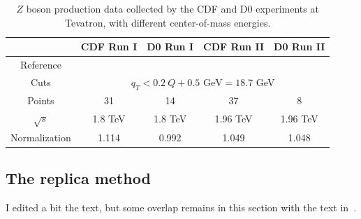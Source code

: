 \documentclass[aps,preprintnumbers,showpacs,nofootinbib,superscriptaddress,floatfix]{revtex4}
\newcommand{\AS}[1]{{\textcolor[rgb]{1,0,1}{#1}}}
\begin{document}
\begin{table}[h!]
\begin{center}
\renewcommand{\tabcolsep}{0.4pc} %
\renewcommand{\arraystretch}{1.2} %
\begin{tabular}{|c|c|c|c|c|}
 \hline
 ~                        & CDF Run I    &  D0 Run I        & CDF Run II        & D0 Run II      \\
 \hline
 Reference        &\cite{Affolder:1999jh} &\cite{Abbott:1999wk}&\cite{Aaltonen:2012fi}&\cite{Abazov:2007ac} \\
\hline
Cuts             & \multicolumn{4}{c|}{$q_T< 0.2\ Q +0.5 \text{ GeV}=18.7$ GeV}                                  \\
\hline
 Points                   &      31      &   14             &       37          &        8       \\
 \hline
 $\sqrt{s}$               &      1.8 TeV &   1.8 TeV        &       1.96 TeV    &       1.96 TeV   \\
 \hline
Normalization        &  1.114       &    0.992          &       1.049        &       1.048    \\
\hline
\end{tabular}
\caption{$Z$ boson production data collected by the CDF and D0 experiments at Tevatron, with different center-of-mass energies.}
\label{t:data_Z}
\end{center}
\end{table}



\subsection{The replica method}
\label{ss:replica_method}

\AS{ I edited a bit the text, but some overlap remains in this section with the text in~\cite{Signori:2013mda}.}
\end{document}
